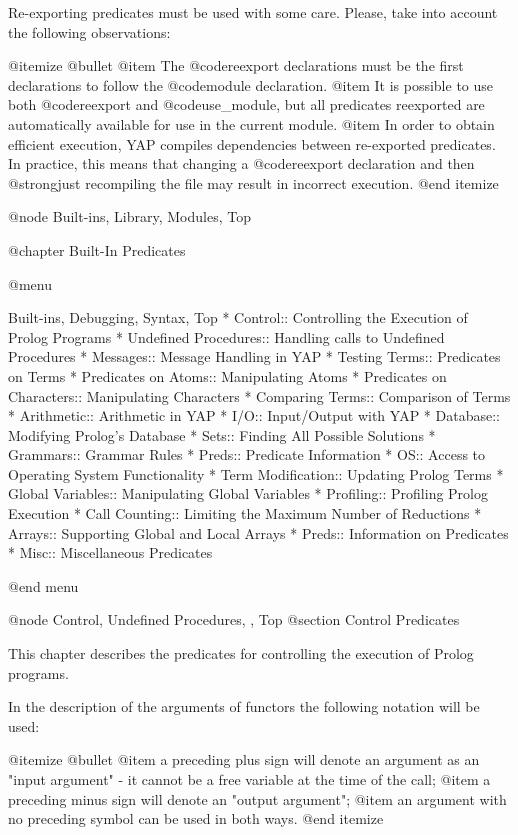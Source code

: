 {{{{Re-exporting predicates must be used with some care. Please, take into
account the following observations:

@itemize @bullet
@item
The @code{reexport} declarations must be the first declarations to
follow the  @code{module} declaration.
@item
It is possible to use both @code{reexport} and @code{use_module}, but
all predicates reexported are automatically available for use in the
current module.
@item
In order to obtain efficient execution, YAP compiles dependencies
between re-exported predicates. In practice, this means that changing a
@code{reexport} declaration and then @strong{just} recompiling the file
may result in incorrect execution.
@end itemize


@node Built-ins, Library, Modules, Top

@chapter Built-In Predicates

@menu

Built-ins, Debugging, Syntax, Top
* Control:: Controlling the Execution of Prolog Programs
* Undefined Procedures:: Handling calls to Undefined Procedures
* Messages:: Message Handling in YAP
* Testing Terms:: Predicates on Terms
* Predicates on Atoms:: Manipulating Atoms
* Predicates on Characters:: Manipulating Characters
* Comparing Terms:: Comparison of Terms
* Arithmetic:: Arithmetic in YAP
* I/O:: Input/Output with YAP
* Database:: Modifying Prolog's Database
* Sets:: Finding All Possible Solutions
* Grammars:: Grammar Rules
* Preds:: Predicate Information
* OS:: Access to Operating System Functionality
* Term Modification:: Updating Prolog Terms
* Global Variables:: Manipulating Global Variables
* Profiling:: Profiling Prolog Execution
* Call Counting:: Limiting the Maximum Number of Reductions
* Arrays:: Supporting Global and Local Arrays
* Preds:: Information on Predicates
* Misc:: Miscellaneous Predicates

@end menu

@node Control, Undefined Procedures, , Top
@section Control Predicates


This chapter describes the predicates for controlling the execution of
Prolog programs.

In the description of the arguments of functors the following notation
will be used:

@itemize @bullet
@item
a preceding plus sign will denote an argument as an "input argument" -
it cannot be a free variable at the time of the call; 
@item
 a preceding minus sign will denote an "output argument";
@item
an argument with no preceding symbol can be used in both ways.
@end itemize


}}}}
